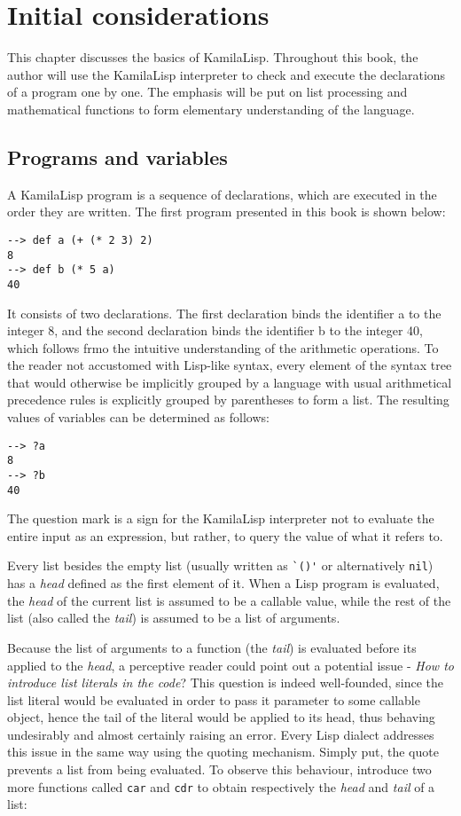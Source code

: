 
\chapter{Initial considerations}

This chapter discusses the basics of KamilaLisp. Throughout this book, the author will use the KamilaLisp interpreter to check and execute the declarations of a program one by one. The emphasis will be put on list processing and mathematical functions to form elementary understanding of the language.

\section{Programs and variables}

A KamilaLisp program is a sequence of declarations, which are executed in the order they are written. The first program presented in this book is shown below:

\begin{verbatim}
--> def a (+ (* 2 3) 2)
8
--> def b (* 5 a)
40
\end{verbatim}

It consists of two declarations. The first declaration binds the identifier a to the integer 8, and the second declaration binds the identifier b to the integer 40, which follows frmo the intuitive understanding of the arithmetic operations. To the reader not accustomed with Lisp-like syntax, every element of the syntax tree that would otherwise be implicitly grouped by a language with usual arithmetical precedence rules is explicitly grouped by parentheses to form a list. The resulting values of variables can be determined as follows:

\begin{verbatim}
--> ?a
8
--> ?b
40
\end{verbatim}

The question mark is a sign for the KamilaLisp interpreter not to evaluate the entire input as an expression, but rather, to query the value of what it refers to.

Every list besides the empty list (usually written as \verb|`()'| or alternatively \verb|nil|) has a \textit{head} defined as the first element of it. When a Lisp program is evaluated, the \textit{head} of the current list is assumed to be a callable value, while the rest of the list (also called the \textit{tail}) is assumed to be a list of arguments.

Because the list of arguments to a function (the \textit{tail}) is evaluated before its applied to the \textit{head}, a perceptive reader could point out a potential issue - \textit{How to introduce list literals in the code}? This question is indeed well-founded, since the list literal would be evaluated in order to pass it parameter to some callable object, hence the tail of the literal would be applied to its head, thus behaving undesirably and almost certainly raising an error. Every Lisp dialect addresses this issue in the same way using the quoting mechanism. Simply put, the quote prevents a list from being evaluated. To observe this behaviour, introduce two more functions called \verb|car| and \verb|cdr| to obtain respectively the \textit{head} and \textit{tail} of a list:

